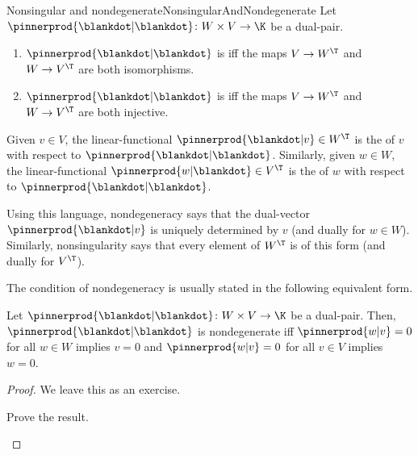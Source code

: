\begin{dfn}{Nonsingular and nondegenerate\hfill}{NonsingularAndNondegenerate}
	Let $\pinnerprod{\blankdot |\blankdot}\colon W\times V\rightarrow \K$ be a dual-pair.
	\begin{enumerate}
		\item $\pinnerprod{\blankdot |\blankdot}$ is  iff the maps $V\rightarrow W^{\T}$ and $W\rightarrow V^{\T}$ are both isomorphisms.
		\item $\pinnerprod{\blankdot |\blankdot}$ is  iff the maps $V\rightarrow W^{\T}$ and $W\rightarrow V^{\T}$ are both injective.
	\end{enumerate}
	\begin{rmk}
		Given $v\in V$, the linear-functional $\pinnerprod{\blankdot |v}\in W^{\T}$ is the  of $v$ with respect to $\pinnerprod{\blankdot |\blankdot}$.  Similarly, given $w\in W$, the linear-functional $\pinnerprod{w|\blankdot}\in V^{\T}$ is the  of $w$ with respect to $\pinnerprod{\blankdot |\blankdot}$.
		
		Using this language, nondegeneracy says that the dual-vector $\pinnerprod{\blankdot |v}$ is uniquely determined by $v$ (and dually for $w\in W$).  Similarly, nonsingularity says that every element of $W^{\T}$ is of this form (and dually for $V^{\T}$).
	\end{rmk}
\end{dfn}
The condition of nondegeneracy is usually stated in the following equivalent form.
\begin{prp}{}{}
	Let $\pinnerprod{\blankdot |\blankdot}\colon W\times V\rightarrow \K$ be a dual-pair.  Then, $\pinnerprod{\blankdot |\blankdot}$ is nondegenerate iff $\pinnerprod{w|v}=0$ for all $w\in W$ implies $v=0$ and $\pinnerprod{w|v}=0$ for all $v\in V$ implies $w=0$.
	\begin{proof}
		We leave this as an exercise.
		\begin{exr}[breakable=false]{}{}
			Prove the result.
		\end{exr}
	\end{proof}
\end{prp}
